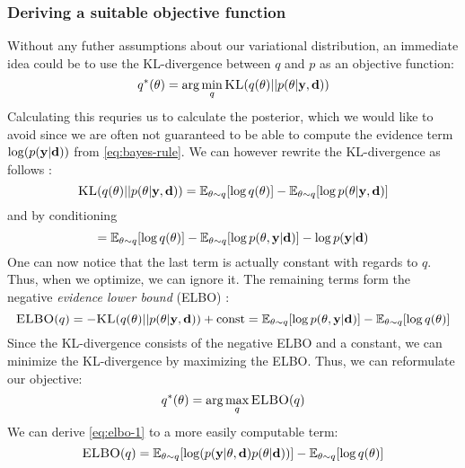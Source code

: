 \subsubsection{Deriving a suitable objective function}
Without any futher assumptions about our variational distribution, an immediate idea could be to use the KL-divergence between $q$ and $p$ as an objective function:
\begin{equation}\label{eq:kld}q^*(\theta) = \arg \min_{q} \textsc{KL}(q(\theta) || p(\theta | \mathbf{y}, \mathbf{d}))\end{equation}
Calculating this requries us to calculate the posterior, which we would like to avoid since we are often not guaranteed to be able to compute the evidence term $\log(p(\mathbf{y} | \mathbf{d}))$ from \eqref{eq:bayes-rule}.
We can however rewrite the KL-divergence as follows \cite{blei17}:
\begin{equation}\textsc{KL}(q(\theta)|| p(\theta| \mathbf{y}, \mathbf{d})) = \mathbb{E}_{\theta \sim q}[\log q(\theta)] - \mathbb{E}_{\theta \sim q}[\log p(\theta|\mathbf{y}, \mathbf{d})]\end{equation}
and by conditioning
\begin{equation}\label{eq:kld-2}= \mathbb{E}_{\theta \sim q}[\log q(\theta)] - \mathbb{E}_{\theta \sim q}[\log p(\theta, \mathbf{y}| \mathbf{d})] - \log p(\mathbf{y}| \mathbf{d})\end{equation}
One can now notice that the last term is actually constant with regards to $q$.
Thus, when we optimize, we can ignore it. The remaining terms form the negative \textit{evidence lower bound} (ELBO) \cite{blei17}:
\begin{equation}\label{eq:elbo-1}\textsc{ELBO}(q)= -\textsc{KL}(q(\theta) || p(\theta | \mathbf{y}, \mathbf{d})) + \textrm{const}= \mathbb{E}_{\theta \sim q}[\log p(\theta, \mathbf{y}| \mathbf{d})]-\mathbb{E}_{\theta \sim q}[\log q(\theta)]\end{equation}
Since the KL-divergence consists of the negative ELBO and a constant, we can minimize the KL-divergence by maximizing the ELBO. Thus, we can reformulate our objective:
\begin{equation}\label{eq:elbo-objective}q^*(\theta) = \arg \max_{q} \textsc{ELBO}(q)\end{equation}
We can derive \eqref{eq:elbo-1} to a more easily computable term:
\begin{equation}\label{eq:elbo-2}\textsc{ELBO}(q) = \mathbb{E}_{\theta \sim q}[\log (p(\mathbf{y}| \theta , \mathbf{d})p(\theta | \mathbf{d}))] - \mathbb{E}_{\theta \sim q}[\log q(\theta)]\end{equation}
